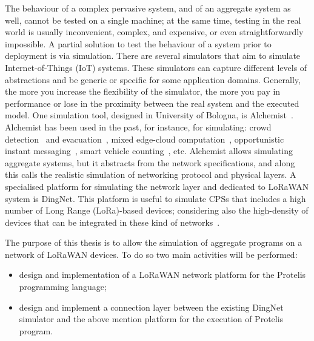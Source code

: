 The behaviour of a complex pervasive system, and of an aggregate system as well, cannot be tested on a single machine; at the same time, testing in the real world is usually inconvenient, complex, and expensive, or even straightforwardly impossible.
A partial solution to test the behaviour of a system prior to deployment is via simulation.
There are several simulators that aim to simulate Internet-of-Things (IoT) systems.
These simulators can capture different levels of abstractions and be generic or specific for some application domains.
Generally, the more you increase the flexibility of the simulator, the more you pay in performance or lose in the proximity between the real system and the executed model.
One simulation tool, designed in University of Bologna, is Alchemist~\cite{PianiniJOS2013}.
Alchemist has been used in the past, for instance, for simulating: crowd detection~\cite{FGCS2017, TOMACS2018} and evacuation~\cite{DBLP:journals/corr/abs-1711-08297}, mixed edge-cloud computation~\cite{Coordination2019-sgcg}, opportunistic instant messaging~\cite{Coordination2019-processes}, smart vehicle counting~\cite{Viroli2016}, etc.
Alchemist allows simulating aggregate systems, but it abstracts from the network specifications, and along this calls the realistic simulation of networking protocol and physical layers.
A specialised platform for simulating the network layer and dedicated to LoRaWAN system is DingNet. %
This platform is useful to simulate CPSs that includes a high number of Long Range (LoRa)-based devices; considering also the high-density of devices that can be integrated in these kind of networks~\cite{Lavric2019}. 

The purpose of this thesis is to allow the simulation of aggregate programs on a network of LoRaWAN devices.
To do so two main activities will be performed: 
\begin{itemize}
    \item design and implementation of a LoRaWAN network platform for the Protelis~\cite{PianiniSAC2015} programming language;
    \item design and implement a connection layer between the existing DingNet simulator and the above mention platform for the execution of Protelis program.
\end{itemize}

